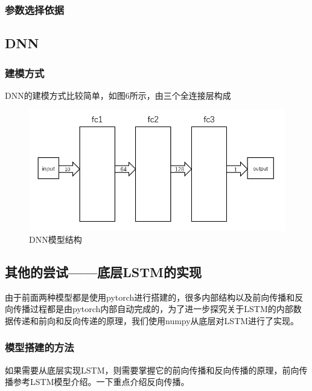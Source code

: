 \documentclass[UTF8]{ctexart}
\begin{document}
\subsubsection{参数选择依据}
\subsection{DNN}
\subsubsection{建模方式}
DNN的建模方式比较简单，如图6所示，由三个全连接层构成
\begin{figure}[!htbp]
    \centering
    \includegraphics[scale = 0.6]{p8.png}
    \caption{DNN模型结构\cite{2}}
\end{figure}
\subsection{其他的尝试——底层LSTM的实现}
由于前面两种模型都是使用pytorch进行搭建的，很多内部结构以及前向传播和反向传播过程都是由pytorch内部自动完成的，为了进一步探究关于LSTM的内部数据传递和前向和反向传递的原理，我们使用numpy从底层对LSTM进行了实现。
\subsubsection{模型搭建的方法}
如果需要从底层实现LSTM，则需要掌握它的前向传播和反向传播的原理，前向传播参考LSTM模型介绍。一下重点介绍反向传播。
\end{document}
